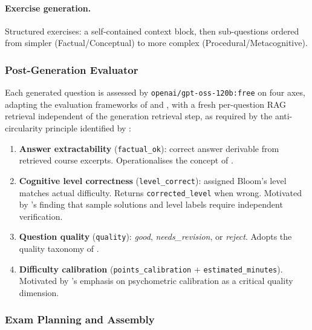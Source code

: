 \documentclass[12pt, a4paper]{article}
\begin{document}
\paragraph{Exercise generation.}
Structured exercises: a self-contained context block, then sub-questions ordered
from simpler (Factual/Conceptual) to more complex (Procedural/Metacognitive).

\subsubsection{Post-Generation Evaluator}
\label{subsubsec:evaluator}

Each generated question is assessed by \texttt{openai/gpt-oss-120b:free} on four
axes, adapting the evaluation frameworks of \citet{mucciaccia2025mcq} and
\citet{isley2025quality}, with a fresh per-question RAG retrieval independent of
the generation retrieval step, as required by the anti-circularity principle
identified by \citet{morris2024aqg}:

\begin{enumerate}[leftmargin=2em]
  \item \textbf{Answer extractability} (\texttt{factual\_ok}): correct answer
  derivable from retrieved course excerpts. Operationalises the concept of
  \citet{morris2024aqg}.

  \item \textbf{Cognitive level correctness} (\texttt{level\_correct}): assigned
  Bloom's level matches actual difficulty. Returns \texttt{corrected\_level}
  when wrong. Motivated by \citet{meissner2024itemforge}'s finding that sample
  solutions and level labels require independent verification.

  \item \textbf{Question quality} (\texttt{quality}): \textit{good},
  \textit{needs\_revision}, or \textit{reject}. Adopts the quality taxonomy
  of \citet{mucciaccia2025mcq}.

  \item \textbf{Difficulty calibration} (\texttt{points\_calibration} +
  \texttt{estimated\_minutes}). Motivated by \citet{isley2025quality}'s emphasis
  on psychometric calibration as a critical quality dimension.
\end{enumerate}

\subsubsection{Exam Planning and Assembly}
\label{subsubsec:planner}
\end{document}
